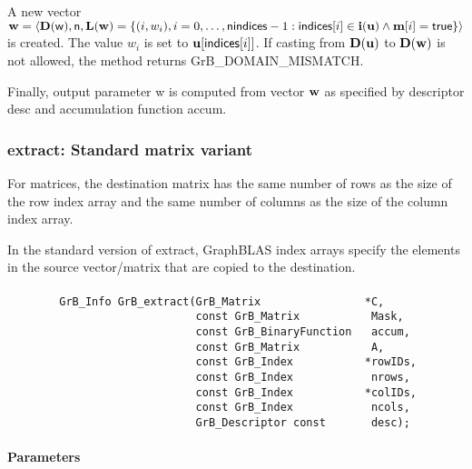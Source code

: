 A new vector ${\bf w} = \langle \bold{D}({\sf w}),{\sf n},
\bold{L}({\bf w}) = \{ (i,w_i), i = 0,\ldots,{\sf nindices}-1 : {\sf indices}[i]
\in \bold{i}({\bf u}) \wedge {\bf m}[i] = {\sf true} \} \rangle$
is created.  The value $w_i$ is set to ${\bf u}[{\sf indices}[i]]$. If
casting from $\bold{D}({\bf u})$ to $\bold{D}({\bf w})$ is not
allowed, the method returns {\sf GrB\_DOMAIN\_MISMATCH}.

Finally, output parameter {\sf w} is computed from vector ${\bf w}$ as
specified by descriptor {\sf desc} and accumulation function {\sf accum}.



\subsubsection{{\sf extract}: Standard matrix variant}

For matrices, the destination matrix has
the same number of rows as the size of the row index array and the same
number of columns as the size of the column index array.

In the standard version of {\sf extract}, GraphBLAS index arrays
specify the elements in the source vector/matrix that are copied to
the destination. 


\paragraph{\syntax}

\begin{verbatim}                 
        GrB_Info GrB_extract(GrB_Matrix                *C,
                             const GrB_Matrix           Mask,
                             const GrB_BinaryFunction   accum,
                             const GrB_Matrix           A,
                             const GrB_Index           *rowIDs,
                             const GrB_Index            nrows,
                             const GrB_Index           *colIDs,
                             const GrB_Index            ncols,
                             GrB_Descriptor const       desc);
\end{verbatim}

\paragraph{Parameters}

